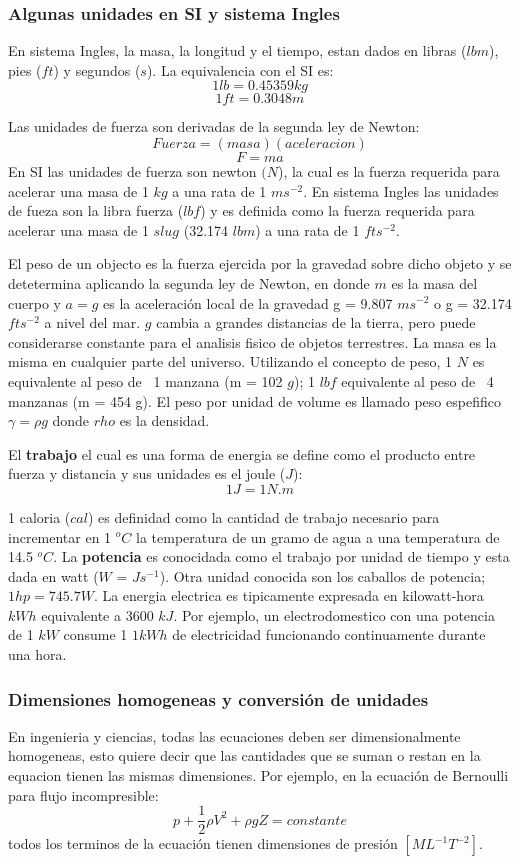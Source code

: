 \documentclass[10pt, oneside]{article}
\begin{document}
\subsubsection{Algunas unidades en SI y sistema Ingles}
En sistema Ingles, la masa, la longitud y el tiempo, estan dados en libras ($lbm$), pies ($ft$) y segundos ($s$). La equivalencia con el SI es:
$$
1 lb = 0.45359 kg
$$
$$
1 ft = 0.3048 m 
$$

Las unidades de fuerza son derivadas de la segunda ley de Newton:
$$
Fuerza = (masa) (aceleracion)
$$
$$
F = ma
$$
En SI las unidades de fuerza son newton $(N$), la cual es la fuerza requerida para acelerar una masa de 1 $kg$ a una rata de 1 $m s^{-2}$. En sistema Ingles las unidades de fueza son la libra fuerza ($lbf$) y es definida como la fuerza requerida para acelerar una masa de 1 $slug$ (32.174 $lbm$) a una rata de 1 $ft s^{-2}$. 

El peso de un objecto es la fuerza ejercida por la gravedad sobre dicho objeto y se detetermina aplicando la segunda ley de Newton, en donde $m$ es la masa del cuerpo y $a=g$ es la aceleraci\'on local de la gravedad g = 9.807 $m s^{-2}$ o g = 32.174 $ft s^{-2}$ a nivel del mar. $g$ cambia a grandes distancias de la tierra, pero puede considerarse constante para el analisis fisico de objetos terrestres. La masa es la misma en cualquier parte del universo. Utilizando el concepto de peso, 1 $N$ es equivalente al peso de ~1 manzana (m = 102 $g$); 1 $lbf$ equivalente al peso de ~4 manzanas (m = 454 g). El peso por unidad de volume es llamado peso espefifico $\gamma = \rho g$ donde $rho$ es la densidad. 

El \textbf{trabajo} el cual es una forma de energia se define como el producto entre fuerza y distancia y sus unidades es el  joule ($J$):
$$
1J = 1 N.m
$$

1 caloria ($cal$) es definidad como la cantidad de trabajo necesario para incrementar en 1 $^oC$ la temperatura de un gramo de agua a una temperatura de 14.5 $^oC$. La \textbf{potencia} es conocidada como el trabajo por unidad de tiempo y esta dada en watt ($W$ = $J s^{-1}$). Otra unidad conocida son los caballos de potencia; $1 hp = 745.7 W$. La energia electrica es tipicamente expresada en kilowatt-hora $kWh$ equivalente a 3600 $kJ$. Por ejemplo, un electrodomestico con una potencia de 1 $kW$ consume 1 $1kWh$ de electricidad funcionando continuamente durante una hora.


\subsubsection{Dimensiones homogeneas y conversi\'on de unidades}
En ingenieria y ciencias, todas las ecuaciones deben ser dimensionalmente homogeneas, esto quiere decir que las cantidades que se suman o restan en la equacion tienen las mismas dimensiones. Por ejemplo, en la ecuaci\'on de Bernoulli para flujo incompresible:
$$
p + \frac{1}{2} \rho V^2 + \rho g Z = constante
$$
todos los terminos de la ecuaci\'on tienen dimensiones de presi\'on $[ML^{-1}T^{-2}]$.
\end{document}
